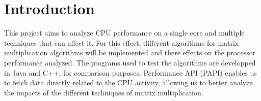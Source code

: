 

\section{Introduction}

This project aims to analyze CPU performance on a single core and multiple techniques that can affect it. For this effect, different algorithms for matrix multiplication algorithms will be implemented and there effects on the processor performance analyzed. The programs used to test the algorithms are developped in Java and C++, for comparison purposes. Performance API (PAPI) enables us to fetch data directly related to the CPU activity, allowing us to better analyze the impacts of the different techniques of matrix multiplication.


